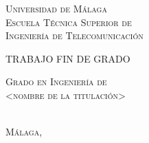 

\thispagestyle{empty}


	\begin{center}
		\Large \scshape
		Universidad de Málaga\\
		\bigskip
		Escuela Técnica Superior de\\
		Ingeniería de Telecomunicación
	\end{center}

	\bigskip


\bigskip

	\bigskip \bigskip \bigskip \bigskip

	\begin{center}
		\Large \scshape
		TRABAJO FIN DE GRADO
	\end{center}

	\bigskip \bigskip \bigskip \bigskip

	\begin{center}
		\huge \scshape
		\tfgtitlename %
	\end{center}

	\vfill

	\begin{center}
		\Large \scshape
		Grado en Ingeniería de\\
		<nombre de la titulación>
	\end{center}

	\bigskip \bigskip \bigskip \bigskip


	\begin{flushright}
		\large \scshape
		\tfgauthorname \\%
		Málaga, \tfganno %
	\end{flushright}

\blankpage